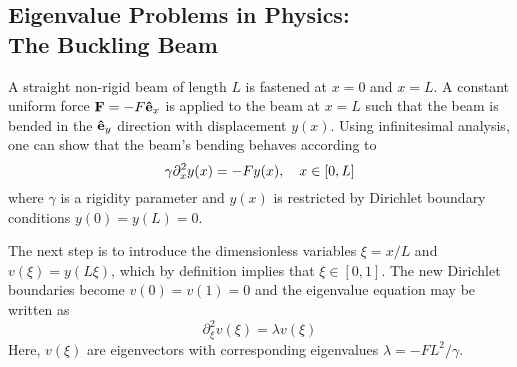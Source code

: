 \documentclass[reprint,english]{revtex4-1}
\begin{document}
\subsection{Eigenvalue Problems in Physics:\\The Buckling Beam}
A straight non-rigid beam of length \(L\) is fastened at \(x=0\) and \(x=L\). A constant uniform force \(\vb{F}=-F\vu{e}_x\) is applied to the beam at \(x=L\) such that the beam is bended in the \(\vu{e}_y\) direction with displacement \(y(x)\). Using infinitesimal analysis, one can show that the beam's bending behaves according to
\begin{equation}\label{eq:initial_buckling_beam}
\gamma\partial_x^2y(x)=-Fy(x)\qc x\in[0,L]
\end{equation}
where \(\gamma\) is a rigidity parameter and \(y(x)\) is restricted by Dirichlet boundary conditions \(y(0)=y(L)=0\).

The next step is to introduce the dimensionless variables \(\xi=x/L\) and \(v(\xi)=y(L\xi)\), which by definition implies that \(\xi\in[0,1]\). The new Dirichlet boundaries become \(v(0)=v(1)=0\) and the eigenvalue equation may be written as
\begin{equation}\label{eq:dimless_buckling_beam}
\partial_{\xi}^2v(\xi)=\lambda v(\xi)
\end{equation}
Here, \(v(\xi)\) are eigenvectors with corresponding eigenvalues \(\lambda=-FL^2/\gamma\).
\end{document}
